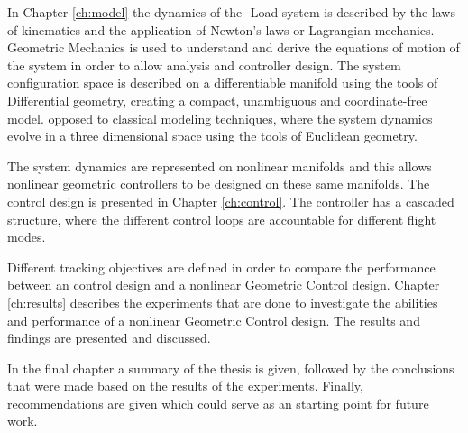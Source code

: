 In Chapter \ref{ch:model} the dynamics of the -Load system is described by the laws of kinematics and the application of Newton's laws or Lagrangian mechanics. 
Geometric Mechanics is used to understand and derive the equations of motion of the system in order to allow analysis and controller design. 
The system configuration space is described on a differentiable manifold using the tools of Differential geometry, creating a compact, unambiguous and coordinate-free model.
opposed to classical modeling techniques, where the system dynamics evolve in a three dimensional space using the tools of Euclidean geometry. 

%

The system dynamics are represented on nonlinear manifolds and this allows nonlinear geometric controllers to be designed on these same manifolds. The control design is presented in Chapter \ref{ch:control}. The controller has a cascaded structure, where the different control loops are accountable for different flight modes. 

Different tracking objectives are defined in order to compare the performance between an  control design and a nonlinear Geometric Control design. 
Chapter \ref{ch:results} describes the experiments that are done to investigate the abilities and performance of a nonlinear Geometric Control design. 
The results and findings are presented and discussed.

In the final chapter a summary of the thesis is given, followed by the conclusions that were made based on the results of the experiments.
Finally, recommendations are given which could serve as an starting point for future work. 

